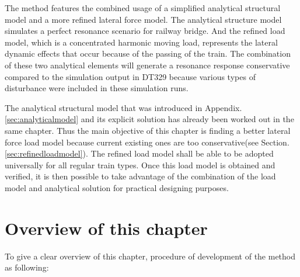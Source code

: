 The method features the combined usage of a simplified analytical structural model and a more refined lateral force model. The analytical structure model simulates a perfect resonance scenario for railway bridge. And the refined load model, which is a concentrated harmonic moving load, represents the lateral dynamic effects that occur because of the passing of the train. The combination of these two analytical elements will generate a resonance response conservative compared to the simulation output in DT329 because various types of disturbance were included in these simulation runs.

The analytical structural model that was introduced in Appendix.\ref{sec:analyticalmodel} and its explicit solution has already been worked out in the same chapter. Thus the main objective of this chapter is finding a better lateral force load model because current existing ones are too conservative(see Section.\ref{sec:refinedloadmodel}). The refined load model shall be able to be adopted universally for all regular train types. Once this load model is obtained and verified, it is then possible to take advantage of the combination of the load model and analytical solution for practical designing purposes.

\section{Overview of this chapter}

To give a clear overview of this chapter, procedure of development of the method  as following:

